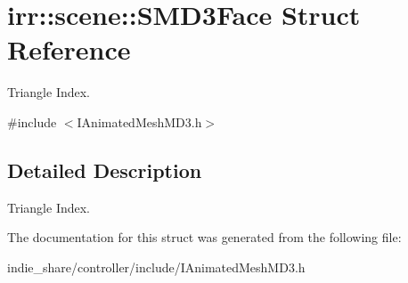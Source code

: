 \hypertarget{structirr_1_1scene_1_1SMD3Face}{}\section{irr\+:\+:scene\+:\+:S\+M\+D3\+Face Struct Reference}
\label{structirr_1_1scene_1_1SMD3Face}


Triangle Index.  




{\ttfamily \#include $<$I\+Animated\+Mesh\+M\+D3.\+h$>$}



\subsection{Detailed Description}
Triangle Index. 

The documentation for this struct was generated from the following file\+:\begin{DoxyCompactItemize}
\item 
indie\+\_\+share/controller/include/I\+Animated\+Mesh\+M\+D3.\+h\end{DoxyCompactItemize}
